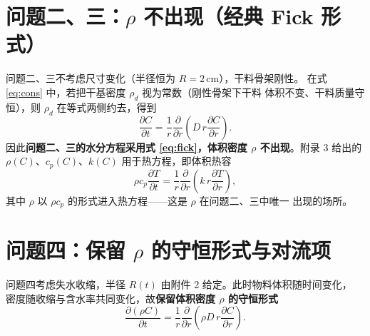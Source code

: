 \documentclass[12pt,a4paper,fontset=none]{ctexart}
\begin{document}
\section{问题二、三：$\rho$ 不出现（经典 Fick 形式）}

问题二、三不考虑尺寸变化（半径恒为 $R=2$\,cm），干料骨架刚性。
在式 \eqref{eq:cons} 中，若把干基密度 $\rho_d$ 视为常数（刚性骨架下干料
体积不变、干料质量守恒），则 $\rho_d$ 在等式两侧约去，得到
\begin{equation}
  \frac{\partial C}{\partial t}
  =\frac{1}{r}\frac{\partial}{\partial r}
   \left(D\,r\frac{\partial C}{\partial r}\right).
  \label{eq:fick}
\end{equation}
因此\textbf{问题二、三的水分方程采用式 \eqref{eq:fick}，体积密度 $\rho$
不出现}。附录 3 给出的 $\rho(C)$、$c_p(C)$、$k(C)$ 用于热方程，即体积热容
\begin{equation}
  \rho c_p\frac{\partial T}{\partial t}
  =\frac{1}{r}\frac{\partial}{\partial r}
   \left(k\,r\frac{\partial T}{\partial r}\right),
\end{equation}
其中 $\rho$ 以 $\rho c_p$ 的形式进入热方程——这是 $\rho$ 在问题二、三中唯一
出现的场所。

\section{问题四：保留 $\rho$ 的守恒形式与对流项}

问题四考虑失水收缩，半径 $R(t)$ 由附件 2 给定。此时物料体积随时间变化，
密度随收缩与含水率共同变化，故\textbf{保留体积密度 $\rho$ 的守恒形式}
\begin{equation}
  \frac{\partial(\rho C)}{\partial t}
  =\frac{1}{r}\frac{\partial}{\partial r}
   \left(\rho D\,r\frac{\partial C}{\partial r}\right).
  \label{eq:p4-cons}
\end{equation}
\end{document}
